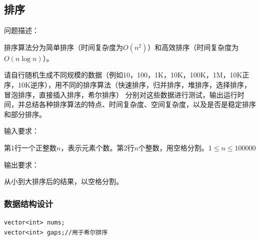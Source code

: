 \subsection{排序}
\begin{formal}
    {\cuhei 问题描述：}

    排序算法分为简单排序（时间复杂度为$O(n^2)$）和高效排序（时间复杂度为$O(n\log n)$）。

    请自行随机生成不同规模的数据（例如10，100，1K，10K，100K，1M，10K正序，10K逆序），用不同的排序算法（快速排序，归并排序，堆排序，选择排序，冒泡排序，直接插入排序，希尔排序）
    分别对这些数据进行测试，输出运行时间，并总结各种排序算法的特点、时间复杂度、空间复杂度，以及是否是稳定排序和部分排序。
\end{formal}
\begin{formal}
    {\cuhei 输入要求：}

    第1行一个正整数$n$，表示元素个数。第2行$n$个整数，用空格分割。$1\leq n\leq 100000$
\end{formal}
\begin{formal}
    {\cuhei 输出要求：}

从小到大排序后的结果，以空格分割。
\end{formal}
\subsubsection{数据结构设计}
\begin{lstlisting}[name=Q1]
vector<int> nums;
vector<int> gaps;//用于希尔排序
\end{lstlisting}
